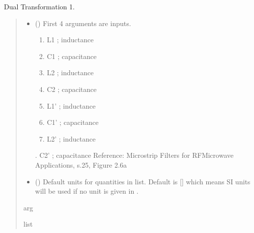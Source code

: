 \documentclass[letterpaper,10pt,english]{sphinxmanual}
\begin{document}

\begin{fulllineitems}
\label{\detokenize{components:components.DualTransformation1}}
\pysigstartsignatures
{}
\pysigstopsignatures
\sphinxAtStartPar
Dual Transformation 1.
\begin{quote}\begin{description}
\begin{itemize}
\item {}
\sphinxAtStartPar
{} () \textendash{}
\sphinxAtStartPar
First 4 arguments are inputs.
\begin{enumerate}
%
\item {}
\sphinxAtStartPar
L1 ; inductance

\item {}
\sphinxAtStartPar
C1 ; capacitance

\item {}
\sphinxAtStartPar
L2 ; inductance

\item {}
\sphinxAtStartPar
C2 ; capacitance

\item {}
\sphinxAtStartPar
L1’ ; inductance

\item {}
\sphinxAtStartPar
C1’ ; capacitance

\item {}
\sphinxAtStartPar
L2’ ; inductance

\end{enumerate}

.  C2’ ; capacitance
Reference:  Microstrip Filters for RF\sphinxhyphen{}Microwave Applications, s.25, Figure 2.6a


\item {}
\sphinxAtStartPar
{} (\sphinxstyleliteralemphasis{\sphinxupquote{, }}) \textendash{} Default units for quantities in  list. Default is {[}{]} which means SI units will be used if no unit is given in .

\end{itemize}

\sphinxAtStartPar
arg

\sphinxAtStartPar
list

\end{description}\end{quote}

\end{fulllineitems}
\end{document}
